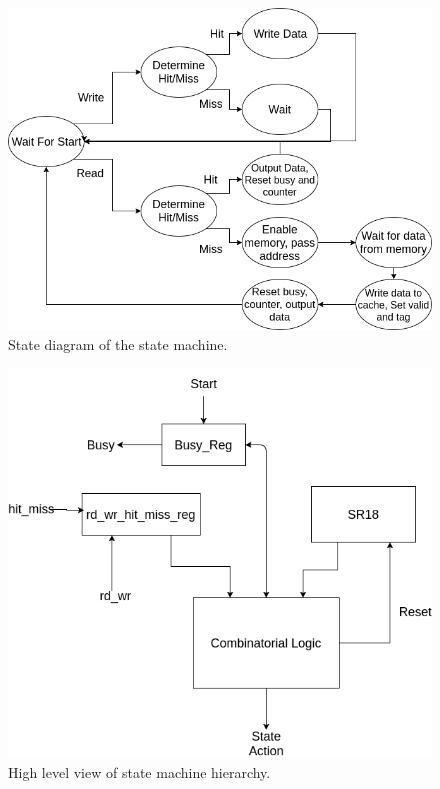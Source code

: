 \documentclass[10pt]{article}
\begin{document}
\begin{figure}[!htb]
    \centering
    \includegraphics[width=\textwidth]{sd.png}
    \caption{State diagram of the state machine.}
    \label{sd}
\end{figure}

\begin{figure}[!htb]
    \centering
    \includegraphics[width=\textwidth]{state.png}
    \caption{High level view of state machine hierarchy.}
    \label{state}
\end{figure}
\end{document}
